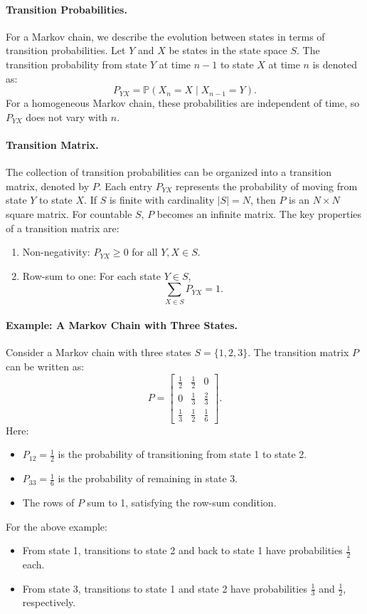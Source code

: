 \paragraph{Transition Probabilities.}
For a Markov chain, we describe the evolution between states in terms of transition probabilities. Let \( Y \) and \( X \) be states in the state space \( S \). The transition probability from state \( Y \) at time \( n-1 \) to state \( X \) at time \( n \) is denoted as:
\[
P_{YX} = \mathbb{P}(X_n = X \mid X_{n-1} = Y).
\]
For a homogeneous Markov chain, these probabilities are independent of time, so \( P_{YX} \) does not vary with \( n \).

\paragraph{Transition Matrix.}
The collection of transition probabilities can be organized into a transition matrix, denoted by \( P \). Each entry \( P_{YX} \) represents the probability of moving from state \( Y \) to state \( X \). If \( S \) is finite with cardinality \( |S| = N \), then \( P \) is an \( N \times N \) square matrix. For countable \( S \), \( P \) becomes an infinite matrix. \newline
The key properties of a transition matrix are:
\begin{enumerate}
    \item Non-negativity: \( P_{YX} \geq 0 \) for all \( Y, X \in S \).
    \item Row-sum to one: For each state \( Y \in S \),
        \[
        \sum_{X \in S} P_{YX} = 1.
        \]
\end{enumerate}

\paragraph{Example: A Markov Chain with Three States.}
Consider a Markov chain with three states \( S = \{1, 2, 3\} \). The transition matrix \( P \) can be written as:
\[
P = 
\begin{bmatrix}
\frac{1}{2} & \frac{1}{2} & 0 \\
0 & \frac{1}{3} & \frac{2}{3} \\
\frac{1}{3} & \frac{1}{2} & \frac{1}{6}
\end{bmatrix}.
\]
Here:
\begin{itemize}
    \item \( P_{12} = \frac{1}{2} \) is the probability of transitioning from state 1 to state 2.
    \item \( P_{33} = \frac{1}{6} \) is the probability of remaining in state 3.
    \item The rows of \( P \) sum to 1, satisfying the row-sum condition.
\end{itemize}
For the above example:
\begin{itemize}
    \item From state 1, transitions to state 2 and back to state 1 have probabilities \( \frac{1}{2} \) each.
    \item From state 3, transitions to state 1 and state 2 have probabilities \( \frac{1}{3} \) and \( \frac{1}{2} \), respectively.
\end{itemize}

